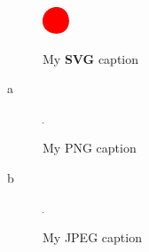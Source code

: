 \documentclass{article}
\begin{document}
\begin{figure}
  \includegraphics[alt={My \textbf{SVG} alt text}]{image.pdf}
  \caption{My \textbf{SVG} caption}
\end{figure}

a

\begin{figure}
  \includegraphics[alt={my PNG alt text}]{image.png}
  \caption{My PNG caption}
\end{figure}

b

\begin{figure}
  \includegraphics[alt={my JPEG alt text}]{image.jpg}
  \caption{My JPEG caption}
\end{figure}
\end{document}
